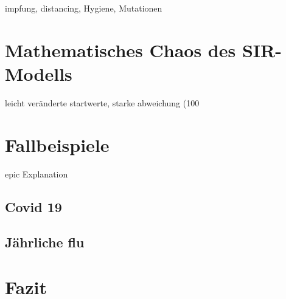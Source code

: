 \documentclass[12pt]{scrartcl} %
\begin{document}
impfung, distancing, Hygiene, Mutationen


\section{Mathematisches Chaos des SIR-Modells}

leicht veränderte startwerte, starke abweichung (100%


\newpage
\section{Fallbeispiele}

epic Explanation


\subsection{Covid 19}

\newpage
\subsection{Jährliche flu}

\newpage
\section{Fazit}


\newpage
\setlength{\bibitemsep}{\baselineskip}
\printbibliography[heading=bibintoc]
\thispagestyle{empty}
\listoffigures
\end{document}
